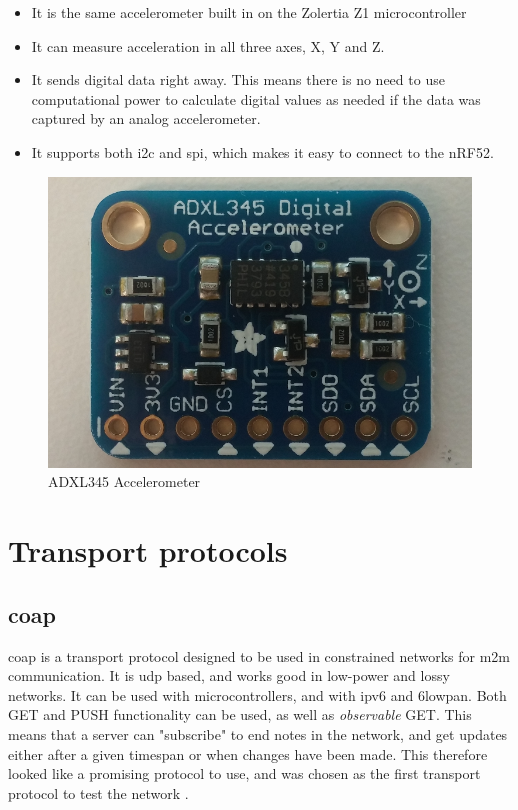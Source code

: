 \begin{itemize}
  \item It is the same accelerometer built in on the Zolertia Z1 microcontroller
  \item It can measure acceleration in all three axes, X, Y and Z.
  \item It sends digital data right away. This means there is no need to use computational power to calculate digital values as needed if the data was captured by an analog accelerometer. 
  \item It supports both \gls{i2c} and \gls{spi}, which makes it easy to connect to the nRF52. 
\end{itemize}


\begin{figure}[h]
    \centering
    \includegraphics[scale=0.32]{ADXL345.png}    \caption{ADXL345 Accelerometer}
    \label{fig:adxl345}
\end{figure}

\newpage

\section{Transport protocols}

\subsection{\gls{coap}}


\gls{coap} is a transport protocol designed to be used in constrained networks for \gls{m2m} communication. It is \gls{udp} based, and works good in low-power and lossy networks. It can be used with microcontrollers, and with \gls{ipv6} and \gls{6lowpan}. Both GET and PUSH functionality can be used, as well as \textit{observable} GET. This means that a server can "subscribe" to end notes in the network, and get updates either after a given timespan or when changes have been made. This therefore looked like a promising protocol to use, and was chosen as the first transport protocol to test the network \cite{shelby2014constrained}.
   


